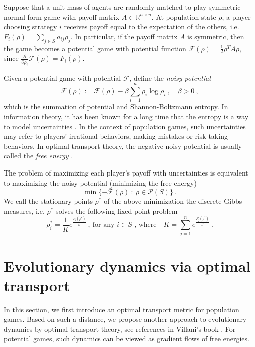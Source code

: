 \documentclass[11pt,reqno]{amsart}
\begin{document}
 Suppose that a unit mass of agents are randomly matched to play symmetric normal-form game with payoff matrix $A\in \mathbb{R}^{n\times n}$.
At population state $\rho$, a player choosing strategy $i$ receives payoff equal
to the expectation of the others, i.e. $F_i(\rho)=\sum_{j\in S}a_{ij}\rho_j$. In particular, if the payoff matrix $A$ is symmetric, then the game becomes a potential game with potential function $\mathcal{F}(\rho)=\frac{1}{2}\rho^TA\rho$, since $\frac{\partial}{\partial \rho_i}\mathcal{F}(\rho)=F_i(\rho)$.

Given a potential game with potential $\mathcal{F}$, define the {\em noisy potential} \begin{equation*}
\mathcal{\bar F}(\rho):=\mathcal{F}(\rho)-\beta \sum_{i=1}^n\rho_i\log\rho_i\ ,\quad \beta>0\ ,
\end{equation*}
which is the summation of potential and Shannon-Boltzmann entropy. 
In information theory, it has been known for a long time that the entropy is a way to model uncertainties \cite{Fisher}. In the context of population games, such uncertainties may refer to
players' irrational behaviors, making mistakes or risk-taking behaviors. 
In optimal transport theory, the negative noisy potential is usually called the {\em free energy} \cite{vil2003, vil2008}. 

The problem of maximizing each player's payoff with uncertainties is equivalent to maximizing the noisy potential (minimizing the free energy)
\begin{equation*}
\min\{-\mathcal{\bar F}(\rho)~:~\rho\in\mathcal{P}(S)\}\ .
\end{equation*}
We call the stationary points $\rho^*$ of the above minimization the
discrete Gibbs measures, i.e.
$\rho^*$ solves the following fixed point problem
\begin{equation}\label{gibbs}
\rho_i^*=\frac{1}{K}e^{\frac{F_i(\rho^*)}{\beta}}\ ,~\textrm{for any $i\in S$\ , where}\quad K=\sum_{j=1}^n e^{\frac{F_j(\rho^*)}{\beta}}\ .
\end{equation}

\section{Evolutionary dynamics via optimal transport}\label{derivation}
In this section, we first introduce an optimal transport metric for population games. Based on such a distance, we propose another approach to evolutionary dynamics by optimal transport theory, see references in Villani's book \cite{vil2003, vil2008}. For potential games, such dynamics can be viewed as gradient flows of free energies. 
\end{document}
